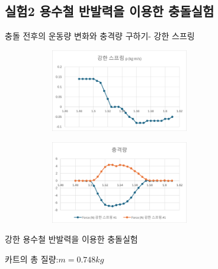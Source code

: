 \documentclass[12pt,a4paper]{article}
\begin{document}
\subsection{실험2 용수철 반발력을 이용한 충돌실험}
충돌 전후의 운동량 변화와 충격량 구하기- 강한 스프링

\begin{figure}[h!]
    \centering
    \begin{subfigure}{0.4\textwidth}
        \includegraphics[width=6cm]{W11G8.png}
    \end{subfigure}
    \begin{subfigure}{0.4\textwidth}
        \includegraphics[width=6cm]{W11G9.png}
    \end{subfigure}
\end{figure}
강한 용수철 반발력을 이용한 충돌실험

카트의 총 질량:$m=0.748kg$
\end{document}
